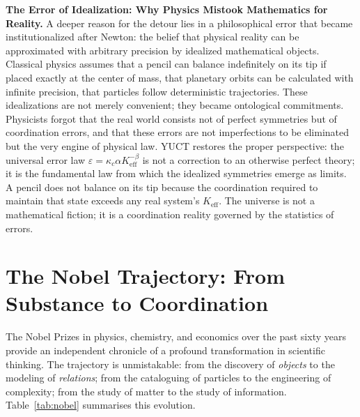 \documentclass[12pt,a4paper]{article}
\begin{document}
	\textbf{The Error of Idealization: Why Physics Mistook Mathematics for Reality.} A deeper reason for the detour lies in a philosophical error that became institutionalized after Newton: the belief that physical reality can be approximated with arbitrary precision by idealized mathematical objects. Classical physics assumes that a pencil can balance indefinitely on its tip if placed exactly at the center of mass, that planetary orbits can be calculated with infinite precision, that particles follow deterministic trajectories. These idealizations are not merely convenient; they became ontological commitments. Physicists forgot that the real world consists not of perfect symmetries but of coordination errors, and that these errors are not imperfections to be eliminated but the very engine of physical law. YUCT restores the proper perspective: the universal error law \(\varepsilon = \kappa_c \alpha K_{\mathrm{eff}}^{-\beta}\) is not a correction to an otherwise perfect theory; it is the fundamental law from which the idealized symmetries emerge as limits. A pencil does not balance on its tip because the coordination required to maintain that state exceeds any real system's \(K_{\mathrm{eff}}\). The universe is not a mathematical fiction; it is a coordination reality governed by the statistics of errors.
	
	\section{The Nobel Trajectory: From Substance to Coordination}
	
	The Nobel Prizes in physics, chemistry, and economics over the past sixty years provide an independent chronicle of a profound transformation in scientific thinking. The trajectory is unmistakable: from the discovery of \emph{objects} to the modeling of \emph{relations}; from the cataloguing of particles to the engineering of complexity; from the study of matter to the study of information. Table~\ref{tab:nobel} summarises this evolution.
	
\end{document}
